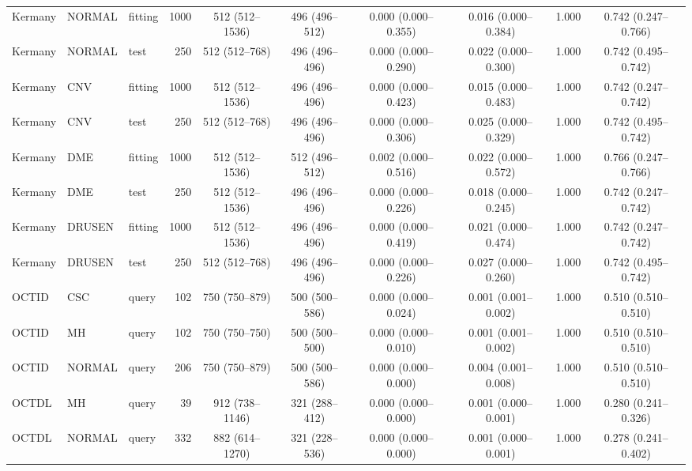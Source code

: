 \begin{tabular}{@{}lllrcccccc@{}}
Kermany & NORMAL & fitting & 1000 & 512 (512--1536) & 496 (496--512) & 0.000 (0.000--0.355) & 0.016 (0.000--0.384) & 1.000 & 0.742 (0.247--0.766) \\
Kermany & NORMAL & test & 250 & 512 (512--768) & 496 (496--496) & 0.000 (0.000--0.290) & 0.022 (0.000--0.300) & 1.000 & 0.742 (0.495--0.742) \\
Kermany & CNV & fitting & 1000 & 512 (512--1536) & 496 (496--496) & 0.000 (0.000--0.423) & 0.015 (0.000--0.483) & 1.000 & 0.742 (0.247--0.742) \\
Kermany & CNV & test & 250 & 512 (512--768) & 496 (496--496) & 0.000 (0.000--0.306) & 0.025 (0.000--0.329) & 1.000 & 0.742 (0.495--0.742) \\
Kermany & DME & fitting & 1000 & 512 (512--1536) & 512 (496--512) & 0.002 (0.000--0.516) & 0.022 (0.000--0.572) & 1.000 & 0.766 (0.247--0.766) \\
Kermany & DME & test & 250 & 512 (512--1536) & 496 (496--496) & 0.000 (0.000--0.226) & 0.018 (0.000--0.245) & 1.000 & 0.742 (0.247--0.742) \\
Kermany & DRUSEN & fitting & 1000 & 512 (512--1536) & 496 (496--496) & 0.000 (0.000--0.419) & 0.021 (0.000--0.474) & 1.000 & 0.742 (0.247--0.742) \\
Kermany & DRUSEN & test & 250 & 512 (512--768) & 496 (496--496) & 0.000 (0.000--0.226) & 0.027 (0.000--0.260) & 1.000 & 0.742 (0.495--0.742) \\
OCTID & CSC & query & 102 & 750 (750--879) & 500 (500--586) & 0.000 (0.000--0.024) & 0.001 (0.001--0.002) & 1.000 & 0.510 (0.510--0.510) \\
OCTID & MH & query & 102 & 750 (750--750) & 500 (500--500) & 0.000 (0.000--0.010) & 0.001 (0.001--0.002) & 1.000 & 0.510 (0.510--0.510) \\
OCTID & NORMAL & query & 206 & 750 (750--879) & 500 (500--586) & 0.000 (0.000--0.000) & 0.004 (0.001--0.008) & 1.000 & 0.510 (0.510--0.510) \\
OCTDL & MH & query & 39 & 912 (738--1146) & 321 (288--412) & 0.000 (0.000--0.000) & 0.001 (0.000--0.001) & 1.000 & 0.280 (0.241--0.326) \\
OCTDL & NORMAL & query & 332 & 882 (614--1270) & 321 (228--536) & 0.000 (0.000--0.000) & 0.001 (0.000--0.001) & 1.000 & 0.278 (0.241--0.402) \\
\bottomrule
\end{tabular}
